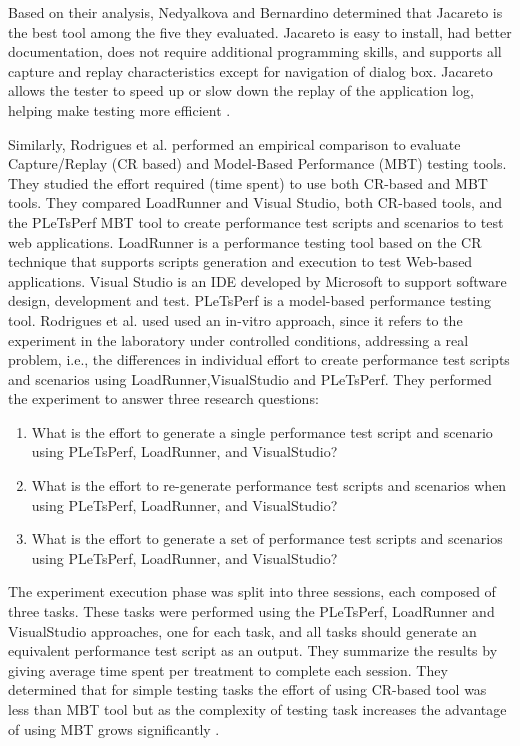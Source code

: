 \documentclass[12pt,journal]{IEEEtran}
\begin{document}
Based on their analysis, Nedyalkova and Bernardino determined that Jacareto is the best tool among the five they evaluated. Jacareto is easy to install, had better documentation, does not require additional programming skills, and supports all capture and replay characteristics except for navigation of dialog box. Jacareto allows the tester to speed up or slow down the replay of the application log, helping make testing more efficient \cite{Nedyalkova:2013:OSC:2494444.2494464}.
\par
Similarly, Rodrigues et al. performed an empirical comparison to evaluate Capture/Replay (CR based) and Model-Based Performance (MBT) testing tools. They studied the effort required (time spent) to use both CR-based and MBT tools. They compared LoadRunner and Visual Studio, both CR-based tools, and the PLeTsPerf MBT tool to create performance test scripts and scenarios to test web applications. LoadRunner is a performance testing tool based on the CR technique that supports scripts generation and execution to test Web-based applications. Visual Studio is an IDE developed by Microsoft to support software design, development and test. PLeTsPerf is a model-based performance testing tool. Rodrigues et al. used used an in-vitro approach, since it refers to the experiment in the laboratory under controlled conditions, addressing a real problem, i.e., the differences in individual effort to create performance test scripts and scenarios using LoadRunner,VisualStudio and PLeTsPerf. They performed the experiment to answer three research questions:
\begin{enumerate}
\item What is the effort to generate a single performance test script and scenario using PLeTsPerf, LoadRunner, and VisualStudio?
\item What is the effort to re-generate performance test scripts and scenarios when using PLeTsPerf, LoadRunner, and VisualStudio?
\item What is the effort to generate a set of performance test scripts and scenarios using PLeTsPerf, LoadRunner, and VisualStudio?
\end{enumerate}
The experiment execution phase was split into three sessions, each composed of three tasks. These tasks were performed using the PLeTsPerf, LoadRunner  and VisualStudio approaches, one for each task, and all tasks should generate an equivalent performance test script as an output. They summarize the results by giving average time spent per treatment to complete each session. They determined that for simple testing tasks the effort of using CR-based tool was less than MBT tool but as the complexity of testing task increases the advantage of using MBT grows significantly \cite{Rodrigues:2014:ECR:2652524.2652587}.
\end{document}
